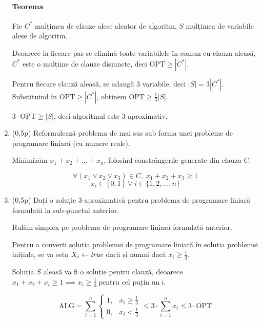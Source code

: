 \documentclass[a4paper,12pt]{article}
\newcommand*{\OPT}{\text{OPT}}
\newcommand*{\ALG}{\text{ALG}}
\begin{document}
\begin{enumerate}[label=\alph*)]
            \paragraph*{Teorema}

            Fie $C^*$ mulțimea de clauze alese aleator de algoritm, $S$ mulțimea de variabile alese de algoritm.

            Deoarece la fiecare pas se elimină toate variabilele în comun cu clauza aleasă,
            $C^*$ este o mulțime de clauze disjuncte, deci $\OPT \geq |C^*|$.

            Pentru fiecare clauză aleasă, se adaugă $3$ variabile, deci $|S| = 3|C^*|$.
            Substituind în $\OPT \geq |C^*|$, obținem $\OPT \geq \frac{1}{3}|S|$.

            $3 \cdot \OPT \geq |S|$, deci algoritmul este 3-aproximativ.

      \item (0,5p) Reformulează problema de mai sus sub forma unei probleme de programare liniară (cu numere reale).

            Minimizăm $x_1 + x_2 + \dots + x_n$, folosind constrângerile generate din clauza $C$:

            \[\forall (x_1 \lor x_2 \lor x_3) \in C,\; x_1 + x_2 + x_3 \geq 1\]
            \[x_i \in [0, 1] \;\forall\; i \in \{1, 2, \dots, n\}\]

      \item (0,5p) Dați o soluție 3-aproximativă pentru problema de programare liniară formulată la sub-punctul anterior.

            Rulăm simplex pe problema de programare liniară formulată anterior.

            Pentru a converti soluția problemei de programare liniară în soluția problemei inițiale,
            se va seta $X_i \leftarrow \text{\it{true}}$ dacă și numai dacă $x_i \geq \frac{1}{3}$.

            Soluția $S$ aleasă va fi o soluție pentru clauză, deoarece
            $x_1 + x_2 + x_i \geq 1 \implies x_i \geq \frac{1}{3}\ \text{pentru cel puțin un}\ i$.

            \[
                  \ALG = \sum_{i=1}^{n}\begin{cases}
                        1, & x_i \geq \frac{1}{3} \\
                        0, & x_i < \frac{1}{3}
                  \end{cases}
                  \leq 3 \cdot \sum_{i=1}^{n} x_i
                  \leq 3 \cdot \OPT
            \]

\end{enumerate}
\end{document}
